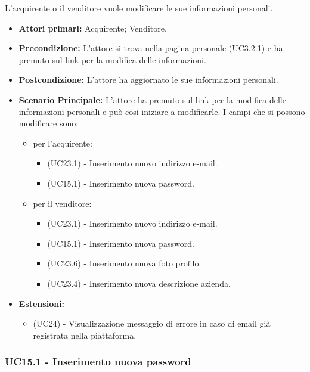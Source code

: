 L'acquirente o il venditore vuole modificare le sue informazioni personali.
\begin{itemize}
    \item \textbf{Attori primari:} Acquirente; Venditore.
    \item \textbf{Precondizione:} L'attore si trova nella pagina personale (UC3.2.1) e ha premuto sul link per la modifica delle informazioni.
    \item \textbf{Postcondizione:} L'attore ha aggiornato le sue informazioni personali.
    \item \textbf{Scenario Principale:} L'attore ha premuto sul link per la modifica delle informazioni personali e può così iniziare a modificarle. I campi che si possono modificare sono:
    \begin{itemize}
        \item per l'acquirente:
        \begin{itemize}
            \item (UC23.1) - Inserimento nuovo indirizzo e-mail.
            \item (UC15.1) - Inserimento nuova password.
        \end{itemize}
        \item per il venditore:
        \begin{itemize}
            \item (UC23.1) - Inserimento nuovo indirizzo e-mail.
            \item (UC15.1) - Inserimento nuova password.
            \item (UC23.6) - Inserimento nuova foto profilo.
            \item (UC23.4) - Inserimento nuova descrizione azienda.
        \end{itemize}
    \end{itemize}
    \item \textbf{Estensioni:}
    \begin{itemize}
        \item (UC24) - Visualizzazione messaggio di errore in caso di email già registrata nella piattaforma.
    \end{itemize}
\end{itemize}

\subsubsection{UC15.1 - Inserimento nuova password}
\label{UC15.1}

